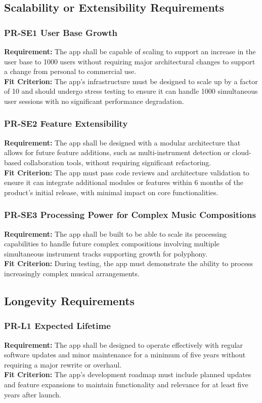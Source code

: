 \documentclass[12pt]{article}
\begin{document}
\subsection{Scalability or Extensibility Requirements}
\subsubsection*{PR-SE1 User Base Growth}
\textbf{Requirement:} The app shall be capable of scaling to support an increase in the user base to 1000 users without requiring major architectural changes to support a change from personal to commercial use.\\
\textbf{Fit Criterion:} The app’s infrastructure must be designed to scale up by a factor of 10 and should undergo stress testing to ensure it can handle 1000 simultaneous user sessions with no significant performance degradation.
\subsubsection*{PR-SE2 Feature Extensibility}
\textbf{Requirement:} The app shall be designed with a modular architecture that allows for future feature additions, such as multi-instrument detection or cloud-based collaboration tools, without requiring significant refactoring.\\
\textbf{Fit Criterion:} The app must pass code reviews and architecture validation to ensure it can integrate additional modules or features within 6 months of the product’s initial release, with minimal impact on core functionalities.
\subsubsection*{PR-SE3 Processing Power for Complex Music Compositions}
\textbf{Requirement:} The app shall be built to be able to scale its processing capabilities to handle future complex compositions involving multiple simultaneous instrument tracks supporting growth for polyphony.\\
\textbf{Fit Criterion:} During testing, the app must demonstrate the ability to process increasingly complex musical arrangements.

\subsection{Longevity Requirements}
\subsubsection*{PR-L1 Expected Lifetime}
\textbf{Requirement:} The app shall be designed to operate effectively with regular software updates and minor maintenance for a minimum of five years without requiring a major rewrite or overhaul.\\
\textbf{Fit Criterion:} The app’s development roadmap must include planned updates and feature expansions to maintain functionality and relevance for at least five years after launch.
\end{document}
